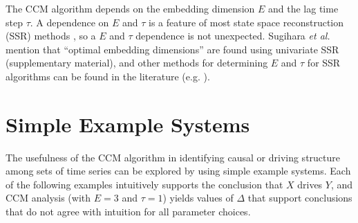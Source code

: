 \documentclass[twocolumn,aps,pre,groupedaddress]{revtex4-1}
\begin{document}
The CCM algorithm depends on the embedding dimension $E$ and the lag time step $\tau$.  A dependence on $E$ and $\tau$ is a feature of most state space reconstruction (SSR) methods \cite{Hong2006,vlachos2009,Small2004}, so a $E$ and $\tau$ dependence is not unexpected.  Sugihara {\em et al.} mention that ``optimal embedding dimensions'' are found using univariate SSR \cite{Sugihara2012} (supplementary material), and other methods for determining $E$ and $\tau$ for SSR algorithms can be found in the literature (e.g. \cite{Hong2006,Small2004,Kennel1992}).

\section{Simple Example Systems}
The usefulness of the CCM algorithm in identifying causal or driving structure among sets of time series can be explored by using simple example systems.  Each of the following examples intuitively supports the conclusion that $X$ drives $Y$, and CCM analysis (with $E=3$ and $\tau=1$) yields values of $\Delta$ that support conclusions that do not agree with intuition for all parameter choices.
\end{document}
